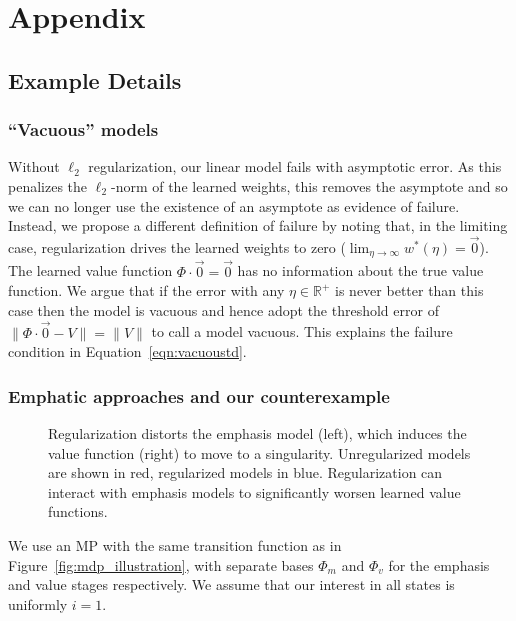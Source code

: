 
\section{Appendix}

\subsection{Example Details}

\subsubsection{``Vacuous'' models}
\label{sec:choiceoffailure}
Without $\ell_2$ regularization, our linear model fails with asymptotic error. As this penalizes the $\ell_2$-norm of the learned weights, this removes the asymptote and so we can no longer use the existence of an asymptote as evidence of failure. Instead, we propose a different definition of failure by noting that, in the limiting case, regularization drives the learned weights to zero ($\lim_{\eta\to\infty} w^*(\eta) = \vec 0$). The learned value function $\Phi\cdot\vec 0 = \vec 0$ has no information about the true value function. We argue that if the error with any $\eta\in\mathbb R^+$ is never better than this case then the model is vacuous and hence adopt the threshold error of $\|\Phi\cdot\vec 0 - V\| = \|V\|$ to call a model vacuous. This explains the failure condition in Equation~\ref{eqn:vacuoustd}.




\subsubsection{Emphatic approaches and our counterexample}
\label{app:emphatic}
\begin{figure}
  
  \caption{Regularization distorts the emphasis model (left), which induces the value function (right) to move to a singularity. Unregularized models are shown in red, regularized models in blue. Regularization can interact with emphasis models to significantly worsen learned value functions. }
  \label{fig:emphasisplots}
\end{figure}

We use an MP with the same transition function as in Figure~\ref{fig:mdp_illustration}, with separate bases $\Phi_m$ and $\Phi_v$ for the emphasis and value stages respectively. We assume that our interest in all states is uniformly $i=1$.

